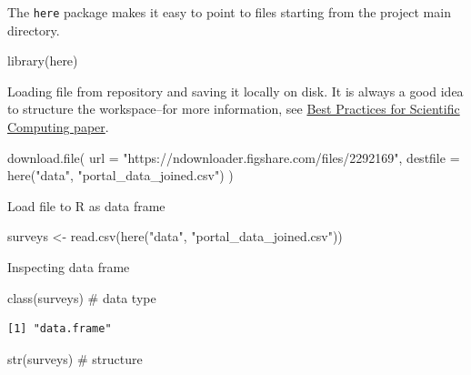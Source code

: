 \documentclass[
  letterpaper,
  DIV=11,
  numbers=noendperiod]{scrreprt}
\newenvironment{Shaded}{\begin{snugshade}}{\end{snugshade}}
\newcommand{\AttributeTok}[1]{\textcolor[rgb]{0.40,0.45,0.13}{#1}}
\newcommand{\CommentTok}[1]{\textcolor[rgb]{0.37,0.37,0.37}{#1}}
\newcommand{\FunctionTok}[1]{\textcolor[rgb]{0.28,0.35,0.67}{#1}}
\newcommand{\NormalTok}[1]{\textcolor[rgb]{0.00,0.23,0.31}{#1}}
\newcommand{\OtherTok}[1]{\textcolor[rgb]{0.00,0.23,0.31}{#1}}
\newcommand{\StringTok}[1]{\textcolor[rgb]{0.13,0.47,0.30}{#1}}
\begin{document}
The \texttt{here} package makes it easy to point to files starting from
the project main directory.

\begin{Shaded}
\begin{Highlighting}[]
\FunctionTok{library}\NormalTok{(here)}
\end{Highlighting}
\end{Shaded}

Loading file from repository and saving it locally on disk. It is always
a good idea to structure the workspace--for more information, see
\href{http://journals.plos.org/plosbiology/article?id=10.1371/journal.pbio.1001745}{Best
Practices for Scientific Computing paper}.

\begin{Shaded}
\begin{Highlighting}[]
\FunctionTok{download.file}\NormalTok{(}
  \AttributeTok{url =} \StringTok{"https://ndownloader.figshare.com/files/2292169"}\NormalTok{,}
  \AttributeTok{destfile =} \FunctionTok{here}\NormalTok{(}\StringTok{"data"}\NormalTok{, }\StringTok{"portal\_data\_joined.csv"}\NormalTok{)}
\NormalTok{)}
\end{Highlighting}
\end{Shaded}

Load file to R as data frame

\begin{Shaded}
\begin{Highlighting}[]
\NormalTok{surveys }\OtherTok{\textless{}{-}} \FunctionTok{read.csv}\NormalTok{(}\FunctionTok{here}\NormalTok{(}\StringTok{"data"}\NormalTok{, }\StringTok{"portal\_data\_joined.csv"}\NormalTok{))}
\end{Highlighting}
\end{Shaded}

Inspecting data frame

\begin{Shaded}
\begin{Highlighting}[]
\FunctionTok{class}\NormalTok{(surveys) }\CommentTok{\# data type}
\end{Highlighting}
\end{Shaded}

\begin{verbatim}
[1] "data.frame"
\end{verbatim}

\begin{Shaded}
\begin{Highlighting}[]
\FunctionTok{str}\NormalTok{(surveys) }\CommentTok{\# structure}
\end{Highlighting}
\end{Shaded}
\end{document}
